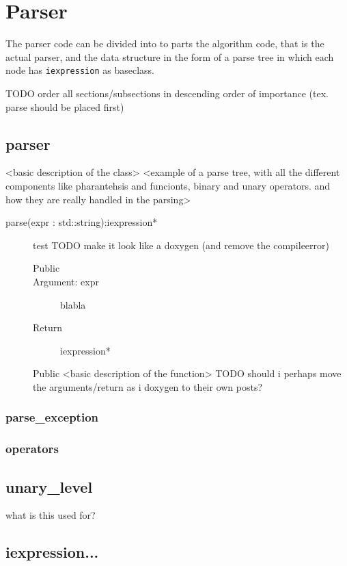 \documentclass[a4paper,11pt]{kth-mag}
\begin{document}
\section{Parser}
The parser code can be divided into to parts the algorithm code, that is the actual parser, and the data structure in the form of a parse tree in which each node has \texttt{iexpression} as baseclass.

TODO order all sections/subsections in descending order of importance (tex. parse should be placed first)
\subsection{parser}
<basic description of the class>
<example of a parse tree, with all the different components like pharantehsis
and funcionts, binary and unary operators. and how they are really handled in
the parsing>

\begin{description}
    \item[parse(expr : std::string):iexpression*] test
        TODO make it look like a doxygen (and remove the compileerror)
        \begin{description}
            \item[Public]
            \item[Argument: expr] blabla
            \item[Return] iexpression*

        \end{description}
        Public <basic description of the function> TODO should i perhaps move the arguments/return as i doxygen to their own posts?
\end{description}
\subsubsection{parse\_exception}
\subsubsection{operators}

\subsection{unary\_level}
what is this used for?
\subsection{iexpression...}
\end{document}

